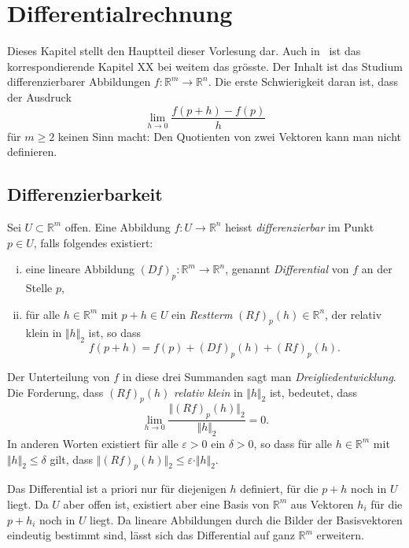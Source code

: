 \documentclass[../main.tex]{subfiles}
\begin{document}
\chapter{Differentialrechnung}\label{chp:differential}
Dieses Kapitel stellt den Hauptteil dieser Vorlesung dar.
Auch in~\cite{heuser} ist das korrespondierende
Kapitel XX bei weitem das grösste. Der Inhalt ist das
Studium differenzierbarer Abbildungen
$f \colon \mathbb{R}^m \to \mathbb{R}^n$.
Die erste Schwierigkeit daran ist, dass der Ausdruck
\[
  \lim_{h \to 0} \frac{f(p + h) - f(p)}{h}
\]
für $m \geq 2$ keinen Sinn macht: Den
Quotienten von zwei Vektoren kann man nicht
definieren.

\section{Differenzierbarkeit}
\begin{definition}
  Sei $U \subset \mathbb{R}^m$ offen. Eine Abbildung
  $f \colon U \to \mathbb{R}^n$ heisst
  \emph{differenzierbar} im Punkt $p \in U$, falls
  folgendes existiert:
  \begin{enumerate}[(i)]
    \item eine lineare Abbildung
      ${(Df)}_p \colon \mathbb{R}^m \to \mathbb{R}^n$,
      genannt \emph{Differential} von $f$ an
      der Stelle $p$,
    \item für alle $h \in \mathbb{R}^m$ mit $p + h \in U$
      ein \emph{Restterm} ${(Rf)}_p(h) \in \mathbb{R}^n$,
      der relativ klein in $\Vert h \Vert_2$ ist,
      so dass
      \[
        f(p+h) = f(p) + {(Df)}_p(h) + {(Rf)}_p(h).
      \]
  \end{enumerate}
  Der Unterteilung von $f$ in diese drei Summanden sagt man
  \emph{Dreigliedentwicklung}. Die Forderung,
  dass ${(Rf)}_p(h)$ \emph{relativ klein} in $\Vert h \Vert_2$
  ist, bedeutet, dass
  \[
    \lim_{h \to 0} \frac{\Vert {(Rf)}_p(h)\Vert_2}{\Vert h \Vert_2}
    = 0.
  \]
  In anderen Worten existiert für alle $\varepsilon > 0$ ein $\delta > 0 $,
  so dass für alle $h \in \mathbb{R}^m$ mit $\Vert h \Vert_2
  \leq \delta$ gilt, dass $\Vert {(Rf)}_p(h) \Vert_2
  \leq \varepsilon \cdot \Vert h \Vert_2$.
\end{definition}

\begin{remark}
  Das Differential ist a priori nur für diejenigen
  $h$ definiert, für die $p + h$ noch in $U$
  liegt. Da $U$ aber offen ist, existiert aber
  eine Basis von $\mathbb{R}^m$ aus Vektoren
  $h_i$ für die $p + h_i$ noch in $U$ liegt.
  Da lineare Abbildungen durch die Bilder der
  Basisvektoren eindeutig bestimmt sind, lässt
  sich das Differential auf ganz $\mathbb{R}^m$
  erweitern.
\end{remark}
\end{document}
